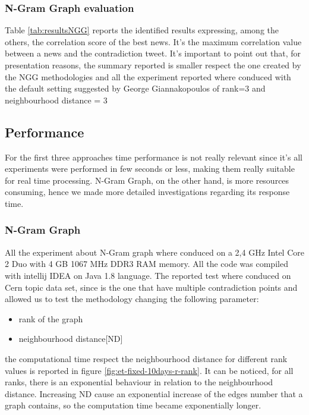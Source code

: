 \subsubsection*{N-Gram Graph evaluation}
Table \ref{tab:resultsNGG} reports the identified results expressing, among the others, the correlation score of the best news. It's the maximum correlation value between a news and the contradiction tweet.
It's important to point out that, for presentation reasons, the summary reported is smaller respect the one created by the NGG methodologies and all the experiment reported where conduced with the default setting suggested by George Giannakopoulos of rank=3 and neighbourhood distance = 3









\subsection*{Performance}
For the first three approaches time performance is not really relevant since it's all experiments were performed in few seconds or less, making them really suitable for real time processing. N-Gram Graph, on the other hand, is more resources consuming, hence we made more detailed investigations regarding its  response time.

\subsubsection*{N-Gram Graph }
All the experiment about N-Gram graph where conduced on a 2,4 GHz Intel Core 2 Duo with 4 GB 1067 MHz DDR3 RAM memory.
 All the code was compiled with intellij IDEA on Java 1.8 language. 
The reported test where conduced on Cern topic data set, since is the one that have multiple contradiction points and allowed us to test the methodology changing the following parameter:
\begin{itemize}
	\item rank of the graph
	\item neighbourhood distance[ND]
\end{itemize}


the computational time respect the neighbourhood distance for different rank values is reported in figure \ref{fig:et-fixed-10days-r-rank}.
It can be noticed, for all ranks, there is an exponential behaviour in relation to the neighbourhood distance. 
Increasing ND cause an exponential increase of the edges number that a graph contains, so the computation time became exponentially longer.

